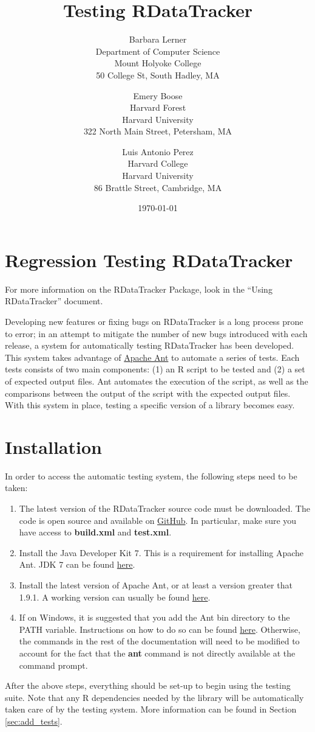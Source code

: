 \documentclass[12pt]{article}
\title{Testing RDataTracker}
\author{
        Barbara Lerner \\
                Department of Computer Science\\
        Mount Holyoke College\\
        50 College St, South Hadley, MA
            \and
        Emery Boose\\
        Harvard Forest\\
        Harvard University\\
        322 North Main Street, Petersham, MA 
        	\and 
        Luis Antonio Perez \\
        Harvard College \\
        Harvard University \\
        86 Brattle Street, Cambridge, MA
}
\date{\today}
\begin{document}
\maketitle

\newpage
\tableofcontents
\listoffigures
\newpage

\section{Regression Testing RDataTracker}

For more information on the RDataTracker Package, look in the ``Using RDataTracker'' document.

\bigskip

Developing new features or fixing bugs on RDataTracker is a long process prone to error; in an attempt to mitigate the number of new bugs introduced with each release, a system for automatically testing RDataTracker has been developed. This system takes advantage of \href{http://ant.apache.org/}{Apache Ant} to automate a series of tests. Each tests consists of two main components: (1) an R script to be tested and (2) a set of expected output files. Ant automates the execution of the script, as well as the comparisons between the output of the script with the expected output files. With this system in place, testing a specific version of a library becomes easy.

\section{Installation}
In order to access the automatic testing system, the following steps need to be taken:
\begin{enumerate}
\item The latest version of the RDataTracker source code must be downloaded. The code is open source and available on \href{https://github.com/blernermhc/RDataTracker}{GitHub}. In particular, make sure you have access to \textbf{build.xml} and \textbf{test.xml}.
\item Install the Java Developer Kit 7. This is a requirement for installing Apache Ant. JDK 7 can be found \href{http://www.oracle.com/technetwork/java/javase/downloads/jdk7-downloads-1880260.html}{here}.
\item Install the latest version of Apache Ant, or at least a version greater that 1.9.1. A working version can usually be found \href{http://ant.apache.org/bindownload.cgi}{here}.
\item If on Windows, it is suggested that you add the Ant bin directory to the PATH variable. Instructions on how to do so can be found \href{http://www.computerhope.com/issues/ch000549.htm}{here}. Otherwise, the commands in the rest of the documentation will need to be modified to account for the fact that the \textbf{ant} command is not directly available at the command prompt.
\end{enumerate}
After the above steps, everything should be set-up to begin using the testing suite. Note that any R dependencies needed by the library will be automatically taken care of by the testing system. More information can be found in Section \ref{sec:add_tests}.
\end{document}

